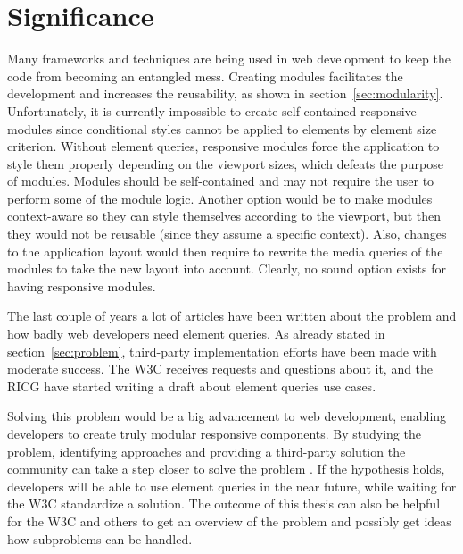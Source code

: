 \documentclass[a4paper,11pt]{kth-mag}
\begin{document}
    \section{Significance}
      Many frameworks and techniques are being used in \gls{web} development to keep the code from becoming an entangled mess.
      Creating modules facilitates the development and increases the reusability, as shown in section~\ref{sec:modularity}.
      Unfortunately, it is currently impossible to create \gls{self-contained} \gls{responsive} modules since conditional styles cannot be applied to \glspl{element} by \gls{element} size criterion.
      Without element queries, \gls{responsive} modules force the application to style them properly depending on the \gls{viewport} sizes, which defeats the purpose of modules.
      Modules should be \gls{self-contained} and may not require the user to perform some of the module logic.
      Another option would be to make modules context-aware so they can style themselves according to the \gls{viewport}, but then they would not be reusable (since they assume a specific context).
      Also, changes to the application layout would then require to rewrite the \gls{media queries} of the modules to take the new layout into account.
      Clearly, no sound option exists for having \gls{responsive} modules.

      The last couple of years a lot of articles have been written about the problem and how badly \gls{web} developers need element queries.
      As already stated in section~\ref{sec:problem}, \gls{third-party} implementation efforts have been made with moderate success.
      The \gls{W3C} receives requests and questions about it, and the \gls{RICG} have started writing a draft \cite{ricg_draft} about element queries use cases.

      Solving this problem would be a big advancement to \gls{web} development, enabling developers to create truly modular \gls{responsive} components.
      By studying the problem, identifying approaches and providing a \gls{third-party} solution the community can take a step closer to solve the problem .
      If the hypothesis holds, developers will be able to use element queries in the near future, while waiting for the \gls{W3C} standardize a solution. 
      The outcome of this thesis can also be helpful for the \gls{W3C} and others to get an overview of the problem and possibly get ideas how subproblems can be handled.
\end{document}
